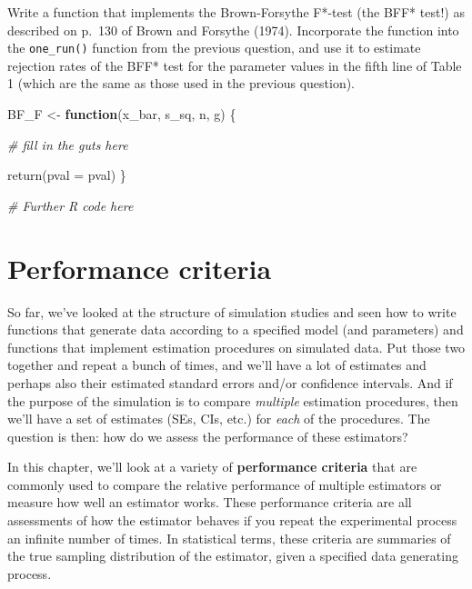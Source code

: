 \documentclass[
]{book}
\newenvironment{Shaded}{\begin{snugshade}}{\end{snugshade}}
\newcommand{\AttributeTok}[1]{\textcolor[rgb]{0.77,0.63,0.00}{#1}}
\newcommand{\CommentTok}[1]{\textcolor[rgb]{0.56,0.35,0.01}{\textit{#1}}}
\newcommand{\ControlFlowTok}[1]{\textcolor[rgb]{0.13,0.29,0.53}{\textbf{#1}}}
\newcommand{\FunctionTok}[1]{\textcolor[rgb]{0.00,0.00,0.00}{#1}}
\newcommand{\NormalTok}[1]{#1}
\newcommand{\OtherTok}[1]{\textcolor[rgb]{0.56,0.35,0.01}{#1}}
\begin{document}
Write a function that implements the Brown-Forsythe F*-test (the BFF* test!) as described on p.~130 of Brown and Forsythe (1974). Incorporate the function into the \texttt{one\_run()} function from the previous question, and use it to estimate rejection rates of the BFF* test for the parameter values in the fifth line of Table 1 (which are the same as those used in the previous question).

\begin{Shaded}
\begin{Highlighting}[]
\NormalTok{BF\_F }\OtherTok{\textless{}{-}} \ControlFlowTok{function}\NormalTok{(x\_bar, s\_sq, n, g) \{}
  
  \CommentTok{\# fill in the guts here}
  
  \FunctionTok{return}\NormalTok{(}\AttributeTok{pval =}\NormalTok{ pval)}
\NormalTok{\}}

\CommentTok{\# Further R code here}
\end{Highlighting}
\end{Shaded}

\hypertarget{performance-criteria}{%
\chapter{Performance criteria}\label{performance-criteria}}

So far, we've looked at the structure of simulation studies and seen how to write functions that generate data according to a specified model (and parameters) and functions that implement estimation procedures on simulated data.
Put those two together and repeat a bunch of times, and we'll have a lot of estimates and perhaps also their estimated standard errors and/or confidence intervals. And if the purpose of the simulation is to compare \emph{multiple} estimation procedures, then we'll have a set of estimates (SEs, CIs, etc.) for \emph{each} of the procedures. The question is then: how do we assess the performance of these estimators?

In this chapter, we'll look at a variety of \textbf{performance criteria} that are commonly used to compare the relative performance of multiple estimators or measure how well an estimator works.
These performance criteria are all assessments of how the estimator behaves if you repeat the experimental process an infinite number of times.
In statistical terms, these criteria are summaries of the true sampling distribution of the estimator, given a specified data generating process.
\end{document}
